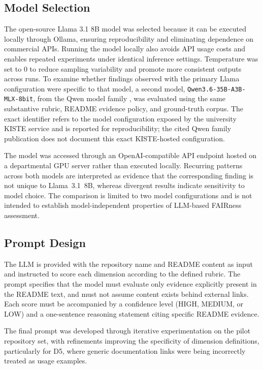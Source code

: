 \subsection{Model Selection}

The open-source Llama 3.1 8B model was selected because it can be 
executed locally through Ollama, ensuring reproducibility and 
eliminating dependence on commercial APIs. Running the model locally 
also avoids API usage costs and enables repeated experiments under 
identical inference settings. Temperature was set to 0 to reduce sampling variability and promote
more consistent outputs across runs.
To examine whether findings observed with the primary Llama
configuration were specific to that model, a second model,
\texttt{Qwen3.6-35B-A3B-MLX-8bit}, from the Qwen model family
\cite{yang2025qwen3}, was evaluated using the same substantive
rubric, README evidence policy, and ground-truth corpus. The exact
identifier refers to the model configuration exposed by the
university KISTE service and is reported for reproducibility; the
cited Qwen family publication does not document this exact
KISTE-hosted configuration.

The model was accessed through an OpenAI-compatible API endpoint
hosted on a departmental GPU server rather than executed locally.
Recurring patterns across both models are interpreted as evidence
that the corresponding finding is not unique to Llama~3.1~8B,
whereas divergent results indicate sensitivity to model choice.
The comparison is limited to two model configurations and is not
intended to establish model-independent properties of LLM-based
FAIRness assessment.

\subsection{Prompt Design}

The LLM is provided with the repository name and README content as 
input and instructed to score each dimension according to the 
defined rubric. The prompt specifies that the model must evaluate 
only evidence explicitly present in the README text, and must not 
assume content exists behind external links. Each score must be 
accompanied by a confidence level (HIGH, MEDIUM, or LOW) and a 
one-sentence reasoning statement citing specific README evidence.

The final prompt was developed through iterative experimentation on 
the pilot repository set, with refinements improving the specificity 
of dimension definitions, particularly for D5, where generic 
documentation links were being incorrectly treated as usage examples.

